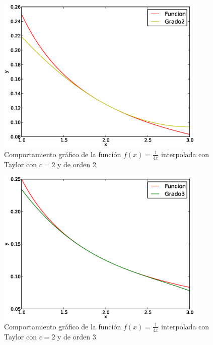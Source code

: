 \documentclass{beamer}
\newtheorem{descripcion de los experimentos}{\underline {Descripcion de los experimentos}}
\begin{document}
\begin{frame}
\hfill \hyperlink{transparencia tabla 2}{}
\begin{figure}\label{transparencia grafica2}
  \caption{Comportamiento gráfico de la función $f(x)=\frac{1}{4x}$ interpolada con Taylor con $c=2$ y de orden 2}
  \includegraphics[width=10cm]{img/tercera.eps}
\end{figure}
\end{frame}


\begin{frame}
\hfill \hyperlink{transparencia tabla 3}{}
\hfill \hyperlink{siguiente}{}
\begin{figure}\label{transparencia grafica3}
  \caption{Comportamiento gráfico de la función $f(x)=\frac{1}{4x}$ interpolada con Taylor con $c=2$ y de orden 3}
  \includegraphics[width=10cm]{img/cuarta.eps}
\end{figure}
\end{frame}
\end{document}
